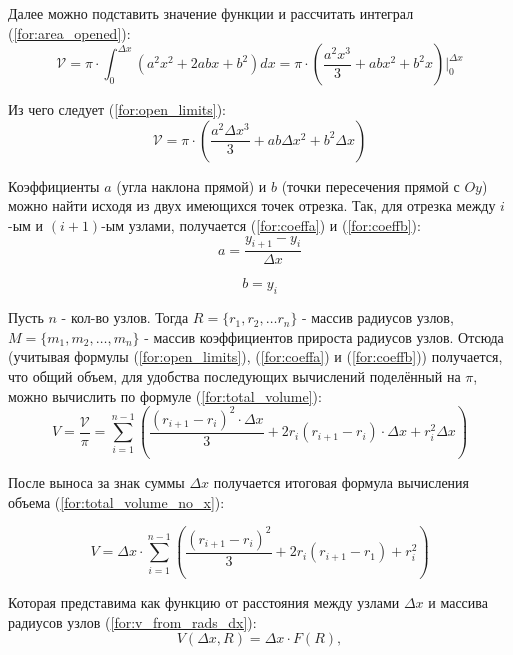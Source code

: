 Далее можно подставить значение функции и рассчитать интеграл (\ref{for:area_opened}):
\begin{equation}
    \label{for:area_opened}
    \mathcal{V} = \pi \cdot \int_{0}^{\Delta x}\left(a^2x^2 + 2abx + b^2\right)dx = \pi \cdot \left(\frac{a^2x^3}{3} + abx^2 + b^2x\right)\Biggr|_{0}^{\Delta x}
\end{equation}

Из чего следует (\ref{for:open_limits}):
\begin{equation}
    \label{for:open_limits}
    \mathcal{V} = \pi \cdot \left(\frac{a^2\Delta x^3}{3} + ab\Delta x^2 + b^2\Delta x\right)
\end{equation}

Коэффициенты $a$ (угла наклона прямой) и $b$ (точки пересечения прямой с $Oy$) можно найти исходя из двух имеющихся точек отрезка. Так, для отрезка между $i$-ым и $(i+1)$-ым узлами, получается (\ref{for:coeffa}) и (\ref{for:coeffb}):
\begin{equation}
    \label{for:coeffa}
    a = \frac{y_{i+1} - y_{i}}{\Delta x}
\end{equation}

\begin{equation}
    \label{for:coeffb}
    b = y_i
\end{equation}

Пусть $n$ - кол-во узлов. Тогда $R = \{ r_1, r_2, \ldots r_n \}$ - массив радиусов узлов, $M = \{ m_1, m_2, \ldots, m_n \}$ - массив коэффициентов прироста радиусов узлов. Отсюда (учитывая формулы (\ref{for:open_limits}), (\ref{for:coeffa}) и (\ref{for:coeffb})) получается, что общий объем, для удобства последующих вычислений поделённый на $\pi$, можно вычислить по формуле (\ref{for:total_volume}):
\begin{equation}
    \label{for:total_volume}
    V = \frac{\mathcal{V}}{\pi} = \sum_{i=1}^{n-1} \left(\frac{(r_{i + 1} - r_i)^2 \cdot \Delta x}{3} + 2 r_i (r_{i + 1} - r_i) \cdot \Delta x + r_i^2 \Delta x \right)
\end{equation}

После выноса за знак суммы $\Delta x$ получается итоговая формула вычисления объема (\ref{for:total_volume_no_x}):

\begin{equation}
    \label{for:total_volume_no_x}
    V = \Delta x \cdot \sum_{i=1}^{n-1} \left(\frac{(r_{i + 1} - r_i)^2}{3} + 2 r_i (r_{i + 1} - r_1) + r_i^2 \right)
\end{equation}

Которая представима как функцию от расстояния между узлами $\Delta x$ и массива радиусов узлов (\ref{for:v_from_rads_dx}):
\begin{equation}
    \label{for:v_from_rads_dx}
    V(\Delta x, R) = \Delta x \cdot F(R), 
\end{equation}

